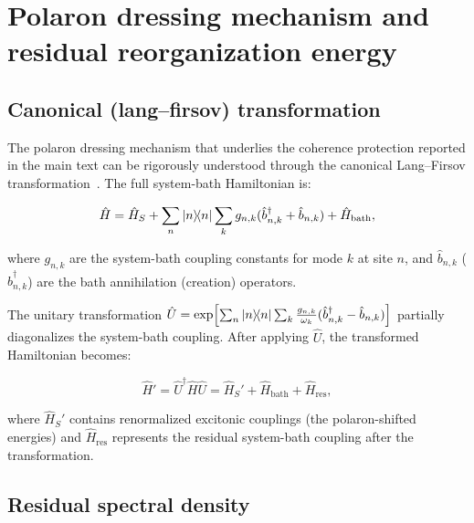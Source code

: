 \documentclass[11pt,a4paper]{article}
\begin{document}

\section{Polaron dressing mechanism and residual reorganization energy}
\label{SI-sec:polaron}

\subsection{Canonical (lang--firsov) transformation}

The polaron dressing mechanism that underlies the coherence protection reported in the main text can be rigorously understood through the canonical Lang--Firsov transformation~\cite{Chin2013,Huelga2013}.
The full system-bath Hamiltonian is:

\begin{equation}
\hat{H} = \hat{H}_S + \sum_n \dyad{n} \sum_k g_{n,k}(\hat{b}_{n,k}^\dagger + \hat{b}_{n,k}) + \hat{H}_{\mathrm{bath}},
\label{eq:SI_full_hamiltonian}
\end{equation}

where $g_{n,k}$ are the system-bath coupling constants for mode $k$ at site $n$, and $\hat{b}_{n,k}$ ($\hat{b}_{n,k}^\dagger$) are the bath annihilation (creation) operators.

The unitary transformation $\hat{U} = \exp\!\left[\sum_n \dyad{n} \sum_k \frac{g_{n,k}}{\omega_k}(\hat{b}_{n,k}^\dagger - \hat{b}_{n,k})\right]$ partially diagonalizes the system-bath coupling.
After applying $\hat{U}$, the transformed Hamiltonian becomes:

\begin{equation}
\hat{H}' = \hat{U}^\dagger \hat{H} \hat{U} = \hat{H}_S' + \hat{H}_{\mathrm{bath}} + \hat{H}_{\mathrm{res}},
\label{eq:SI_lf_hamiltonian}
\end{equation}

where $\hat{H}_S'$ contains renormalized excitonic couplings (the polaron-shifted energies) and $\hat{H}_{\mathrm{res}}$ represents the residual system-bath coupling after the transformation.

\subsection{Residual spectral density}
\end{document}
